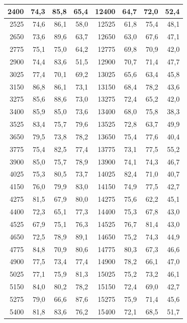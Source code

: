 \begin{small}
\begin{longtable}{|r|r|r|r|r|r|r|r|}
2400 & 74,3 & 85,8 & 65,4 & 12400 & 64,7 & 72,0 & 52,4 \\ \hline
2525 & 74,6 & 86,1 & 58,0 & 12525 & 61,8 & 75,4 & 48,1 \\ \hline
2650 & 73,6 & 89,6 & 63,7 & 12650 & 63,0 & 67,6 & 47,1 \\ \hline
2775 & 75,1 & 75,0 & 64,2 & 12775 & 69,8 & 70,9 & 42,0 \\ \hline
2900 & 74,4 & 83,6 & 51,5 & 12900 & 70,7 & 71,4 & 47,7 \\ \hline
3025 & 77,4 & 70,1 & 69,2 & 13025 & 65,6 & 63,4 & 45,8 \\ \hline
3150 & 86,8 & 86,1 & 73,1 & 13150 & 68,4 & 78,2 & 43,6 \\ \hline
3275 & 85,6 & 88,6 & 73,0 & 13275 & 72,4 & 65,2 & 42,0 \\ \hline
3400 & 85,9 & 85,0 & 73,6 & 13400 & 68,0 & 75,8 & 38,3 \\ \hline
3525 & 83,4 & 75,7 & 79,6 & 13525 & 72,8 & 63,7 & 49,9 \\ \hline
3650 & 79,5 & 73,8 & 78,2 & 13650 & 75,4 & 77,6 & 40,4 \\ \hline
3775 & 75,4 & 82,5 & 77,4 & 13775 & 73,1 & 77,5 & 55,2 \\ \hline
3900 & 85,0 & 75,7 & 78,9 & 13900 & 74,1 & 74,3 & 46,7 \\ \hline
4025 & 75,3 & 80,5 & 73,7 & 14025 & 82,4 & 71,0 & 40,7 \\ \hline
4150 & 76,0 & 79,9 & 83,0 & 14150 & 74,9 & 77,5 & 42,7 \\ \hline
4275 & 81,5 & 67,9 & 80,0 & 14275 & 75,6 & 62,2 & 45,1 \\ \hline
4400 & 72,3 & 65,1 & 77,3 & 14400 & 75,3 & 67,8 & 43,0 \\ \hline
4525 & 67,9 & 75,1 & 76,3 & 14525 & 76,7 & 81,4 & 43,0 \\ \hline
4650 & 72,5 & 78,9 & 89,1 & 14650 & 75,2 & 74,3 & 44,9 \\ \hline
4775 & 84,8 & 70,9 & 80,6 & 14775 & 80,3 & 67,3 & 46,6 \\ \hline
4900 & 77,5 & 73,4 & 77,4 & 14900 & 78,2 & 66,1 & 47,0 \\ \hline
5025 & 77,1 & 75,9 & 81,3 & 15025 & 75,2 & 73,2 & 46,1 \\ \hline
5150 & 84,0 & 80,2 & 78,2 & 15150 & 72,4 & 69,0 & 42,7 \\ \hline
5275 & 79,0 & 66,6 & 87,6 & 15275 & 75,9 & 71,4 & 45,6 \\ \hline
5400 & 81,8 & 83,6 & 76,2 & 15400 & 72,1 & 68,5 & 51,7 \\ \hline

\end{longtable}
\end{small}
